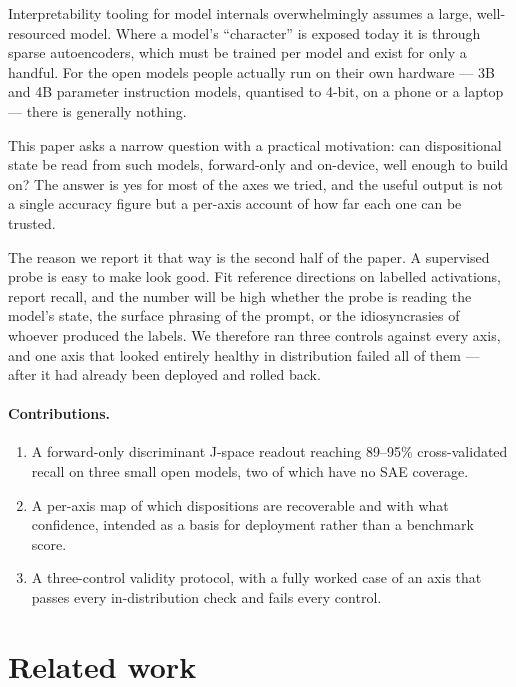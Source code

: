 \documentclass[11pt]{article}
\begin{document}
Interpretability tooling for model internals overwhelmingly assumes a large, well-resourced model.
Where a model's ``character'' is exposed today it is through sparse autoencoders, which must be
trained per model and exist for only a handful. For the open models people actually run on their
own hardware --- 3B and 4B parameter instruction models, quantised to 4-bit, on a phone or a
laptop --- there is generally nothing.

This paper asks a narrow question with a practical motivation: can dispositional state be read
from such models, forward-only and on-device, well enough to build on? The answer is yes for most
of the axes we tried, and the useful output is not a single accuracy figure but a per-axis account
of how far each one can be trusted.

The reason we report it that way is the second half of the paper. A supervised probe is easy to
make look good. Fit reference directions on labelled activations, report recall, and the number
will be high whether the probe is reading the model's state, the surface phrasing of the prompt,
or the idiosyncrasies of whoever produced the labels. We therefore ran three controls against
every axis, and one axis that looked entirely healthy in distribution failed all of them --- after
it had already been deployed and rolled back.

\paragraph{Contributions.}
\begin{enumerate}
\item A forward-only discriminant J-space readout reaching 89--95\% cross-validated recall on
  three small open models, two of which have no SAE coverage.
\item A per-axis map of which dispositions are recoverable and with what confidence, intended as
  a basis for deployment rather than a benchmark score.
\item A three-control validity protocol, with a fully worked case of an axis that passes every
  in-distribution check and fails every control.
\end{enumerate}

\section{Related work}
\end{document}
